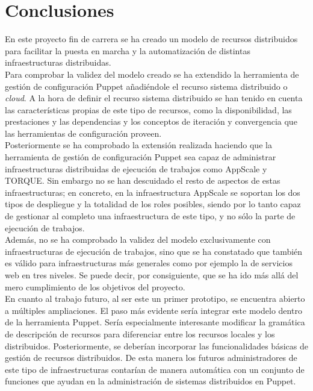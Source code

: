 \chapter{Conclusiones}
\label{cap:conclusiones}


En este proyecto fin de carrera se ha creado un modelo de recursos distribuidos para facilitar la puesta en marcha y la automatización de distintas infraestructuras distribuidas. \\

Para comprobar la validez del modelo creado se ha extendido la herramienta de gestión de configuración Puppet añadiéndole el recurso sistema distribuido o \emph{cloud}. A la hora de definir el recurso sistema distribuido se han tenido en cuenta las características propias de este tipo de recursos, como la disponibilidad, las prestaciones y las dependencias y los conceptos de iteración y convergencia que las herramientas de configuración proveen. \\

Posteriormente se ha comprobado la extensión realizada haciendo que la herramienta de gestión de configuración Puppet sea capaz de administrar infraestructuras distribuidas de ejecución de trabajos como AppScale y TORQUE. Sin embargo no se han descuidado el resto de aspectos de estas infraestructuras; en concreto, en la infraestructura AppScale se soportan los dos tipos de despliegue y la totalidad de los roles posibles, siendo por lo tanto capaz de gestionar al completo una infraestructura de este tipo, y no sólo la parte de ejecución de trabajos. \\

Además, no se ha comprobado la validez del modelo exclusivamente con infraestructuras de ejecución de trabajos, sino que se ha constatado que también es válido para infraestructuras más generales como por ejemplo la de servicios web en tres niveles. Se puede decir, por consiguiente, que se ha ido más allá del mero cumplimiento de los objetivos del proyecto. \\

En cuanto al trabajo futuro, al ser este un primer prototipo, se encuentra abierto a múltiples ampliaciones. El paso más evidente sería integrar este modelo dentro de la herramienta Puppet. Sería especialmente interesante modificar la gramática de descripción de recursos para diferenciar entre los recursos locales y los distribuidos. Posteriormente, se deberían incorporar las funcionalidades básicas de gestión de recursos distribuidos. De esta manera los futuros administradores de este tipo de infraestructuras contarían de manera automática con un conjunto de funciones que ayudan en la administración de sistemas distribuidos en Puppet.


